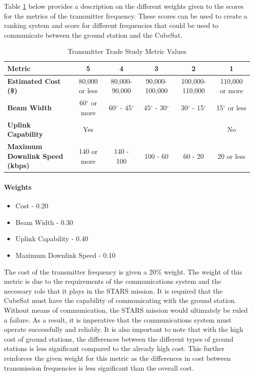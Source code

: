 \documentclass{ece}
\begin{document}
Table \ref{tbl:Transmitter_Metric_Scores} below provides a description on the different weights given to the scores for the metrics of the transmitter frequency. These scores can be used to create a ranking system and score for different frequencies that could be used to communicate between the ground station and the CubeSat. 

\begin{table}[H]
\centering
\begin{tabular}{|p{3.5cm}|c|c|c|c|c|}
\hline
    \textbf{Metric} & \textbf{5} & \textbf{4} & \textbf{3} & \textbf{2} & \textbf{1}
    \\
\hline
    \textbf{Estimated Cost (\$)} & 80,000 or less & 80,000-90,000 & 90,000-100,000 & 100,000-110,000 & 110,000 or more
    \\
\hline
    \textbf{Beam Width} & 60$^{\circ}$ or more & 60$^{\circ}$ - 45$^{\circ}$ & 45$^{\circ}$ - 30$^{\circ}$ & 30$^{\circ}$ - 15$^{\circ}$ & 15$^{\circ}$ or less

    \\
\hline
    \textbf{Uplink Capability} & Yes &  &  &  & No
    \\
\hline
    \textbf{Maximum Downlink Speed (kbps)} & 140 or more & 140 - 100 & 100 - 60 & 60 - 20 & 20 or less
    \\

\hline
\end{tabular}
\caption{Transmitter Trade Study Metric Values}
\label{tbl:Transmitter_Metric_Scores}
\end{table}

\paragraph{Weights}
\begin{itemize}
    \item Cost - 0.20
    \item Beam Width - 0.30
    \item Uplink Capability - 0.40
    \item Maximum Downlink Speed - 0.10
\end{itemize}

The cost of the transmitter frequency is given a 20\% weight. The weight of this metric is due to the requirements of the communications system and the necessary role that it plays in the STARS mission. It is required that the CubeSat must have the capability of communicating with the ground station. Without means of communication, the STARS mission would ultimately be ruled a failure. As a result, it is imperative that the communications system must operate successfully and reliably. It is also important to note that with the high cost of ground stations, the differences between the different types of ground stations is less significant compared to the already high cost. This further reinforces the given weight for this metric as the differences in cost between transmission frequencies is less significant than the overall cost. 
\end{document}
